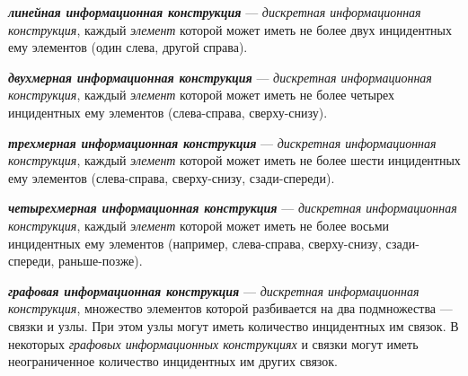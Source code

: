 \begin{SCn}

    \begin{scnindent}
    \end{scnindent}

\end{SCn}

\textbf{\textit{линейная информационная конструкция}} --- \textit{дискретная информационная конструкция}, каждый \textit{элемент} которой может иметь не более двух инцидентных ему элементов (один слева, другой справа).

\textbf{\textit{двухмерная информационная конструкция}} --- \textit{дискретная информационная конструкция}, каждый \textit{элемент} которой может иметь не более четырех инцидентных ему элементов (слева-справа, сверху-снизу).

\textbf{\textit{трехмерная информационная конструкция}} --- \textit{дискретная информационная конструкция}, каждый \textit{элемент} которой может иметь не более шести инцидентных ему элементов (слева-справа, сверху-снизу, сзади-спереди).

\textbf{\textit{четырехмерная информационная конструкция}} --- \textit{дискретная информационная конструкция}, каждый \textit{элемент} которой может иметь не более восьми инцидентных ему элементов (например, слева-справа, сверху-снизу, сзади-спереди, раньше-позже).

\textbf{\textit{графовая информационная конструкция}} --- \textit{дискретная информационная конструкция}, множество элементов которой разбивается на два подмножества --- связки и узлы.
При этом узлы могут иметь  количество инцидентных им связок.
В некоторых \textit{графовых информационных конструкциях} и связки могут иметь неограниченное количество инцидентных им других связок.

